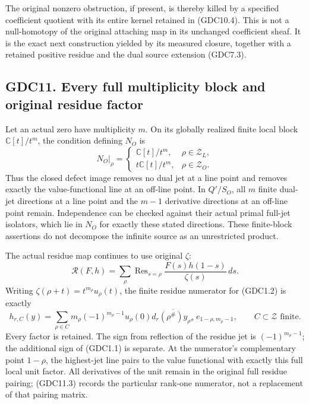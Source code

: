 The original nonzero obstruction, if present, is thereby killed by a
specified coefficient quotient with its entire kernel retained in
(GDC10.4). This is not a null-homotopy of the original attaching map in
its unchanged coefficient sheaf. It is the exact next construction
yielded by its measured closure, together with a retained positive
residue and the dual source extension (GDC7.3).

\subsection{GDC11. Every full multiplicity block and original residue
factor}\label{gdc11.-every-full-multiplicity-block-and-original-residue-factor}

Let an actual zero have multiplicity \(m\). On its globally realized
finite local block \(\mathbb C[t]/t^m\), the condition defining \(N_O\)
is \[
N_O|_\rho=
\begin{cases}
\mathbb C[t]/t^m,&\rho\in\mathscr Z_L,\\
t\mathbb C[t]/t^m,&\rho\in\mathscr Z_O.
\end{cases}
\tag{GDC11.1}
\] Thus the closed defect image removes no dual jet at a line point and
removes exactly the value-functional line at an off-line point. In
\(Q'/S_O\), all \(m\) finite dual-jet directions at a line point and the
\(m-1\) derivative directions at an off-line point remain. Independence
can be checked against their actual primal full-jet isolators, which lie
in \(N_O\) for exactly these stated directions. These finite-block
assertions do not decompose the infinite source as an unrestricted
product.

The actual residue map continues to use original \(\zeta\): \[
\mathcal R(F,h)=\sum_\rho\operatorname{Res}_{s=\rho}
\frac{F(s)h(1-s)}{\zeta(s)}\,ds.
\tag{GDC11.2}
\] Writing \(\zeta(\rho+t)=t^{m_\rho}u_\rho(t)\), the finite residue
numerator for (GDC1.2) is exactly \[
h_{r,C}(y)=\sum_{\rho\in C}
m_\rho(-1)^{m_\rho-1}u_\rho(0)
\overline{d_r(\rho^\#)y_{\rho^\#}}\,
e_{1-\rho,m_\rho-1},\qquad C\subset\mathscr Z\text{ finite}.
\tag{GDC11.3}
\] Every factor is retained. The sign from reflection of the residue jet
is \((-1)^{m_\rho-1}\); the additional sign of (GDC1.1) is separate. At
the numerator's complementary point \(1-\rho\), the highest-jet line
pairs to the value functional with exactly this full local unit factor.
All derivatives of the unit remain in the original full residue pairing;
(GDC11.3) records the particular rank-one numerator, not a replacement
of that pairing matrix.


